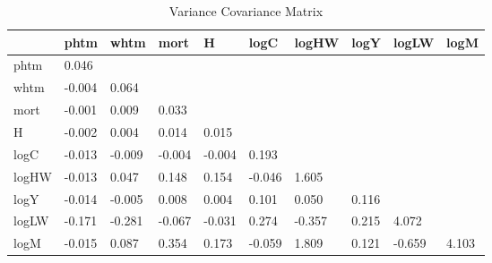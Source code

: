 \begin{table}[htbp]
\caption{\label{clabel} Variance Covariance Matrix}\centering\medskip
\begin{tabular}{llllllllll} \hline \hline
 & phtm  & whtm  & mort  & H  & logC  & logHW  & logY  & logLW  & logM  \\  \hline 
phtm &     0.046 \\  
whtm &    -0.004 &     0.064 \\  
mort &    -0.001 &     0.009 &     0.033 \\  
H &    -0.002 &     0.004 &     0.014 &     0.015 \\  
logC &    -0.013 &    -0.009 &    -0.004 &    -0.004 &     0.193 \\  
logHW &    -0.013 &     0.047 &     0.148 &     0.154 &    -0.046 &     1.605 \\  
logY &    -0.014 &    -0.005 &     0.008 &     0.004 &     0.101 &     0.050 &     0.116 \\  
logLW &    -0.171 &    -0.281 &    -0.067 &    -0.031 &     0.274 &    -0.357 &     0.215 &     4.072 \\  
logM &    -0.015 &     0.087 &     0.354 &     0.173 &    -0.059 &     1.809 &     0.121 &    -0.659 &     4.103 \\  
\hline \hline \end{tabular}
\end{table}
